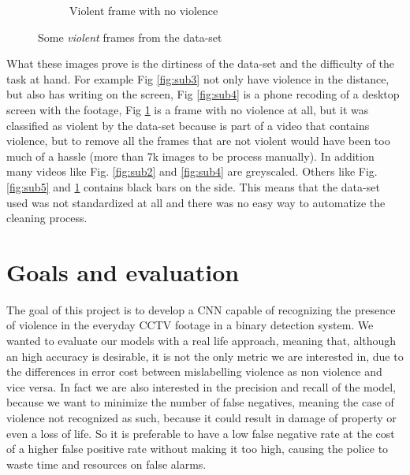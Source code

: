 \begin{figure}[]
\begin{subfigure}{.5\textwidth}
        \caption{Violent frame with no violence}
        \label{fig:sub6}
    \end{subfigure}
    \caption{Some \textit{violent} frames from the data-set}
    \label{fig:overall}
\end{figure}

What these images prove is the dirtiness of the data-set and the difficulty of the task at hand. For example Fig \ref{fig:sub3} not only have violence in the distance, but also has writing on the screen, Fig \ref{fig:sub4} is a phone recoding of a desktop screen with the footage, Fig \ref{fig:sub6} is a frame with no violence at all, but it was classified as violent by the data-set because is part of a video that contains violence, but to remove all the frames that are not violent would have been too much of a hassle (more than 7k images to be process manually). In addition many videos like Fig. \ref{fig:sub2} and \ref{fig:sub4} are greyscaled. Others like Fig. \ref{fig:sub5} and \ref{fig:sub6} contains black bars on the side. This means that the data-set used was not standardized at all and there was no easy way to automatize the cleaning process.

\section{Goals and evaluation}
The goal of this project is to develop a CNN capable of recognizing the presence of violence in the everyday CCTV footage in a binary detection system. We wanted to evaluate our models with a real life approach, meaning that, although an high accuracy is desirable, it is not the only metric we are interested in, due to the differences in error cost between mislabelling violence as non violence and vice versa. In fact we are also interested in the precision and recall of the model, because we want to minimize the number of false negatives, meaning the case of violence not recognized as such, because it could result in damage of property or even a loss of life. So it is preferable to have a low false negative rate at the cost of a higher false positive rate without making it too high, causing the police to waste time and resources on false alarms. 